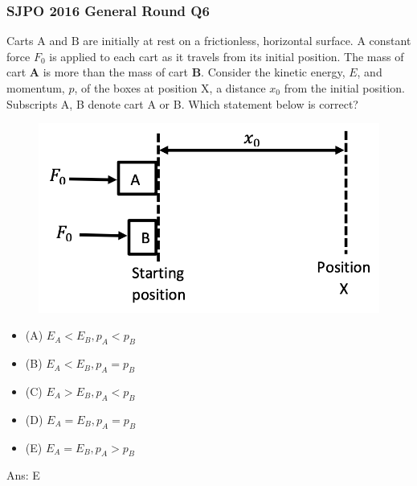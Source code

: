 \documentclass{article}
\begin{document}
\subsubsection{SJPO 2016 General Round Q6}
Carts $\mathrm{A}$ and $\mathrm{B}$ are initially at rest on a frictionless, horizontal surface. A constant force $F_0$ is applied to each cart as it travels from its initial position. The mass of cart $\mathbf{A}$ is more than the mass of cart $\mathbf{B}$. Consider the kinetic energy, $E$, and momentum, $p$, of the boxes at position $\mathrm{X}$, a distance $x_0$ from the initial position. Subscripts A, B denote cart A or B. Which statement below is correct?
{
\begin{figure}
\includegraphics[width=1.0\linewidth]{images/sjpo2016q6.png}
\end{figure}
\begin{itemize}
\item[] (A) $E_A<E_B, p_A<p_B$
\item[] (B) $E_A<E_B, p_A=p_B$
\item[] (C) $E_A>E_B, p_A<p_B$
\item[] (D) $E_A=E_B, p_A=p_B$
\item[] (E) $E_A=E_B, p_A>p_B$
\end{itemize}
}
Ans: \ifpaper E \fi
\end{document}
